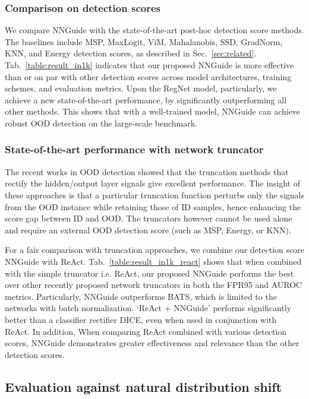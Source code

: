 \documentclass[10pt,twocolumn,letterpaper]{article}
\begin{document}
\vspace{-3mm}
\subsubsection{Comparison on detection scores}
We compare NNGuide with the state-of-the-art post-hoc detection score methods. The baselines include MSP, MaxLogit, ViM, Mahalanobis, SSD, GradNorm, KNN, and Energy detection scores, as described in Sec.~\ref{sec:related}. Tab.~\ref{table:result_in1k} indicates that our proposed NNGuide is more effective than or on par with other detection scores across model architectures, training schemes, and evaluation metrics. Upon the RegNet model, particularly, we achieve a new state-of-the-art performance, by significantly outperforming all other methods. This shows that with a well-trained model, NNGuide can achieve robust OOD detection on the large-scale benchmark.

\subsubsection{State-of-the-art performance with network truncator}
The recent works in OOD detection showed that the truncation methods that rectify the hidden/output layer signals give excellent performance. The insight of these approaches is that a particular truncation function perturbs only the signals from the OOD instance while retaining those of ID samples, hence enhancing the score gap between ID and OOD. The truncators however cannot be used alone and require an external OOD detection score (such as MSP, Energy, or KNN).

For a fair comparison with truncation approaches, we combine our detection score NNGuide with ReAct. Tab.~\ref{table:result_in1k_react} shows that when combined with the simple truncator i.e. ReAct, our proposed NNGuide performs the best over other recently proposed network truncators in both the FPR95 and AUROC metrics. Particularly, NNGuide outperforms BATS, which is limited to the networks with batch normalization. `ReAct + NNGuide' performs significantly better than a classifier rectifier DICE, even when used in conjunction with ReAct. In addition, When comparing ReAct combined with various detection scores, NNGuide demonstrates greater effectiveness and relevance than the other detection scores. 


\subsection{Evaluation against natural distribution shift}
\end{document}
